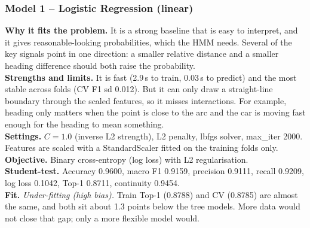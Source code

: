 \documentclass[11pt,a4paper]{article}
\begin{document}
\subsubsection*{Model 1 -- Logistic Regression (linear)}
\textbf{Why it fits the problem.} It is a strong baseline that is easy to interpret, and it gives
reasonable-looking probabilities, which the HMM needs. Several of the key signals point in one direction: a
smaller relative distance and a smaller heading difference should both raise the probability.\\
\textbf{Strengths and limits.} It is fast (2.9\,s to train, 0.03\,s to predict) and the most stable across
folds (CV F1 sd 0.012). But it can only draw a straight-line boundary through the scaled features, so it
misses interactions. For example, heading only matters when the point is close to the arc and the car is
moving fast enough for the heading to mean something.\\
\textbf{Settings.} $C=1.0$ (inverse L2 strength), L2 penalty, lbfgs solver, max\_iter 2000. Features are
scaled with a StandardScaler fitted on the training folds only.\\
\textbf{Objective.} Binary cross-entropy (log loss) with L2 regularisation.\\
\textbf{Student-test.} Accuracy 0.9600, macro F1 0.9159, precision 0.9111, recall 0.9209, log loss 0.1042,
Top-1 0.8711, continuity 0.9454.\\
\textbf{Fit.} \emph{Under-fitting (high bias).} Train Top-1 (0.8788) and CV (0.8785) are almost the same,
and both sit about 1.3 points below the tree models. More data would not close that gap; only a more
flexible model would.
\end{document}
